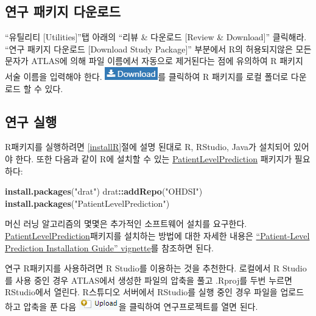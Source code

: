 \documentclass[11pt]{book}
\newenvironment{Shaded}{\begin{snugshade}}{\end{snugshade}}
\newcommand{\KeywordTok}[1]{\textcolor[rgb]{0.13,0.29,0.53}{\textbf{#1}}}
\newcommand{\StringTok}[1]{\textcolor[rgb]{0.31,0.60,0.02}{#1}}
\newcommand{\OperatorTok}[1]{\textcolor[rgb]{0.81,0.36,0.00}{\textbf{#1}}}
\newcommand{\NormalTok}[1]{#1}
\theoremstyle{definition}
\theoremstyle{definition}
\theoremstyle{definition}
\theoremstyle{remark}
\begin{document}
\subsection{연구 패키지 다운로드}\label{--}

``유틸리티 {[}Utilities{]}''탭 아래의 ``리뷰 \& 다운로드 {[}Review \&
Download{]}'' 클릭해라. ``연구 패키지 다운로드 {[}Download Study
Package{]}'' 부분에서 R의 허용되지않은 모든 문자가 ATLAS에 의해 파일
이름에서 자동으로 제거된다는 점에 유의하여 R 패키지 서술 이름을 입력해야
한다. \includegraphics{images/PatientLevelPrediction/download.png}를
클릭하여 R 패키지를 로컬 폴더로 다운로드 할 수 있다.

\subsection{연구 실행}\label{-}

R패키지를 실행하려면 \ref{installR}절에 설명 된대로 R, RStudio, Java가
설치되어 있어야 한다. 또한 다음과 같이 R에 설치할 수 있는
\href{https://ohdsi.github.io/PatientLevelPrediction/}{PatientLevelPrediction}
패키지가 필요하다:

\begin{Shaded}
\begin{Highlighting}[]
\KeywordTok{install.packages}\NormalTok{(}\StringTok{"drat"}\NormalTok{)}
\NormalTok{drat}\OperatorTok{::}\KeywordTok{addRepo}\NormalTok{(}\StringTok{"OHDSI"}\NormalTok{)}
\KeywordTok{install.packages}\NormalTok{(}\StringTok{"PatientLevelPrediction"}\NormalTok{)}
\end{Highlighting}
\end{Shaded}

머신 러닝 알고리즘의 몇몇은 추가적인 소프트웨어 설치를 요구한다.
\href{https://ohdsi.github.io/PatientLevelPrediction/}{PatientLevelPrediction}패키지를
설치하는 방법에 대한 자세한 내용은
\href{https://ohdsi.github.io/PatientLevelPrediction/articles/InstallationGuide.html}{``Patient-Level
Prediction Installation Guide'' vignette}를 참조하면 된다.

연구 R패키지를 사용하려면 R Studio를 이용하는 것을 추천한다. 로컬에서 R
Studio를 사용 중인 경우 ATLAS에서 생성한 파일의 압축을 풀고 .Rproj를
두번 누르면 RStudio에서 열린다. R스튜디오 서버에서 RStudio를 실행 중인
경우 파일을 업로드 하고 압축을 푼 다음
\includegraphics{images/PopulationLevelEstimation/upload.png}을 클릭하여
연구프로젝트를 열면 된다.
\end{document}
